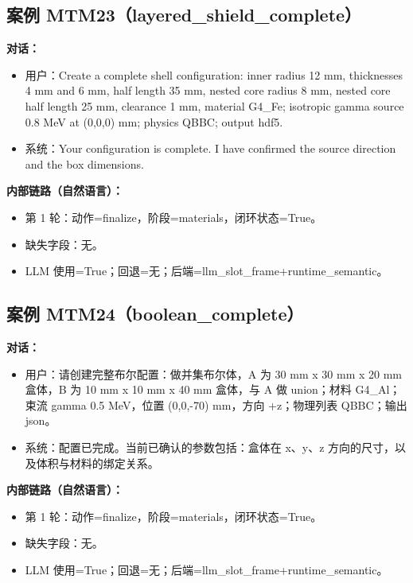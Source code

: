 \documentclass[11pt]{ctexart}
\begin{document}
\subsection{案例 MTM23（layered\_shield\_complete）}
\textbf{对话：}
\begin{itemize}
\item 用户：Create a complete shell configuration: inner radius 12 mm, thicknesses 4 mm and 6 mm, half length 35 mm, nested core radius 8 mm, nested core half length 25 mm, clearance 1 mm, material G4\_Fe; isotropic gamma source 0.8 MeV at (0,0,0) mm; physics QBBC; output hdf5.
\item 系统：Your configuration is complete. I have confirmed the source direction and the box dimensions.
\end{itemize}
\textbf{内部链路（自然语言）：}
\begin{itemize}
\item 第 1 轮：动作=finalize，阶段=materials，闭环状态=True。
\item 缺失字段：无。
\item LLM 使用=True；回退=无；后端=llm\_slot\_frame+runtime\_semantic。
\end{itemize}
\subsection{案例 MTM24（boolean\_complete）}
\textbf{对话：}
\begin{itemize}
\item 用户：请创建完整布尔配置：做并集布尔体，A 为 30 mm x 30 mm x 20 mm 盒体，B 为 10 mm x 10 mm x 40 mm 盒体，与 A 做 union；材料 G4\_Al；束流 gamma 0.5 MeV，位置 (0,0,-70) mm，方向 +z；物理列表 QBBC；输出 json。
\item 系统：配置已完成。当前已确认的参数包括：盒体在 x、y、z 方向的尺寸，以及体积与材料的绑定关系。
\end{itemize}
\textbf{内部链路（自然语言）：}
\begin{itemize}
\item 第 1 轮：动作=finalize，阶段=materials，闭环状态=True。
\item 缺失字段：无。
\item LLM 使用=True；回退=无；后端=llm\_slot\_frame+runtime\_semantic。
\end{itemize}
\end{document}
